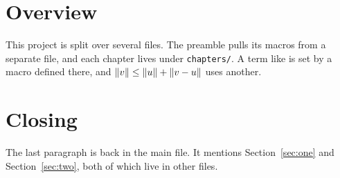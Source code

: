 \documentclass[11pt]{article}
\begin{document}
\section{Overview}
This project is split over several files. The preamble pulls its macros from a separate file, and each chapter lives under \texttt{chapters/}. A term like  is set by a macro defined there, and $\lVert v \rVert \leq \lVert u \rVert + \lVert v-u \rVert$ uses another.





\section{Closing}
The last paragraph is back in the main file. It mentions Section~\ref{sec:one} and Section~\ref{sec:two}, both of which live in other files.
\end{document}

